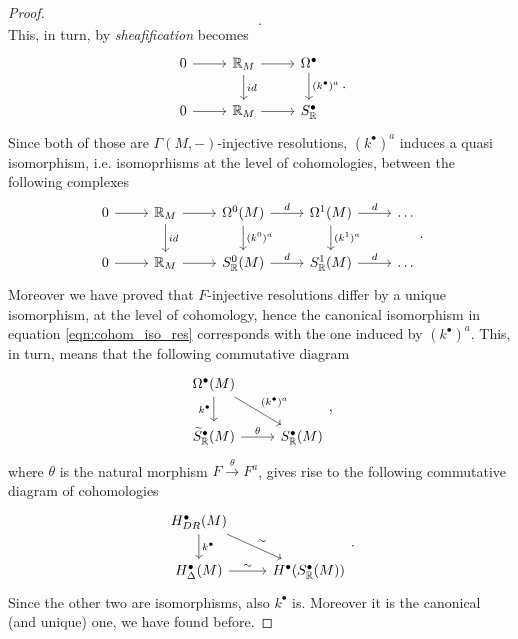 \begin{proof}
\begin{equation}
	.\end{equation} 
	This, in turn, by \textit{sheafification} becomes
	\begin{equation}
	\begin{tikzcd}
		0 \arrow[r, "", rightarrow] & \R_M \arrow[r, "", rightarrow] \arrow[d, "id", rightarrow] & \Omega^\bullet \arrow[d, "{(k^\bullet)^a}", rightarrow] \\
		0 \arrow[r, "", rightarrow] & \R_M \arrow[r, "", rightarrow] & S^\bullet_\R
	\end{tikzcd}
	.\end{equation} 
	Since both of those are $\Gamma(M,-)$-injective resolutions, $(k^\bullet)^a$ induces a quasi isomorphism, i.e. isomoprhisms at the level of cohomologies, between the following complexes
	\begin{equation}
	\begin{tikzcd}
		0 \arrow[r, "", rightarrow] & \R_M \arrow[r, "", rightarrow] \arrow[d, "id", rightarrow] & \Omega^0(M) \arrow[r, "d", rightarrow] \arrow[d, "{(k^0)^a}", rightarrow] & \Omega^1(M) \arrow[r, "d", rightarrow] \arrow[d, "{(k^1)^a}", rightarrow] & \dots \\
		0 \arrow[r, "", rightarrow] & \R_M \arrow[r, "", rightarrow] & S^0_\R(M) \arrow[r, "d", rightarrow] & S^1_\R(M) \arrow[r, "d", rightarrow] & \dots
	\end{tikzcd}
	.\end{equation} 
	Moreover we have proved that $F$-injective resolutions differ by a unique isomorphism, at the level of cohomology, hence the canonical isomorphism in equation \eqref{eqn:cohom_iso_res} corresponds with the one induced by $(k^\bullet)^a$.
	This, in turn, means that the following commutative diagram
	\begin{equation}
	\begin{tikzcd}
		\Omega^\bullet(M) \arrow[d, "k^\bullet"', rightarrow] \arrow[rd, "(k^\bullet)^a", rightarrow] & \\
		\widetilde{S}^\bullet_\R(M) \arrow[r, "\theta", rightarrow] & S^\bullet_\R(M)
	\end{tikzcd}
	,\end{equation} 
	where $\theta$ is the natural morphism $F \xrightarrow{\theta} F^a$, gives rise to the following commutative diagram of cohomologies
	\begin{equation}
	\begin{tikzcd}
		H^\bullet_{DR}(M) \arrow[d, "k^\bullet", rightarrow] \arrow[rd, "\sim", rightarrow] & \\
		H^\bullet_\Delta(M) \arrow[r, "\sim", rightarrow] & H^\bullet(S^\bullet_\R(M))
	\end{tikzcd}
	.\end{equation} 
	Since the other two are isomorphisms, also $k^\bullet$ is.
	Moreover it is the canonical (and unique) one, we have found before.
\end{proof}

